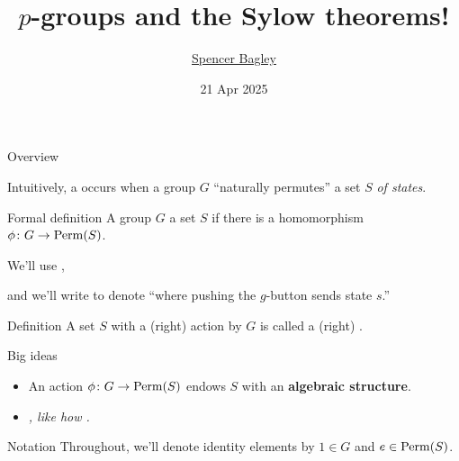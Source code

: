 \documentclass[8pt]{beamer}
\title[$p$-groups and the Sylow theorems!]{$p$-groups and the Sylow theorems!}
\author[\href{mailto:sbagley@westminsteru.edu}{S. Bagley}]
       {\href{mailto:sbagley@westminsteru.edu}{Spencer Bagley}}
\institute[Westminster] { 
  \normalsize With many thanks to Matthew Macauley, \\
  \url{http://www.math.clemson.edu/~macaule/}}
\date[21 Apr 2025]{21 Apr 2025}
\newcommand{\Pause}{\pause}      %
\begin{document}
\frame{\titlepage}


\begin{frame}{Overview} %

  Intuitively, a  occurs when a group $G$
  ``naturally permutes'' a set $S$ \emph{of states}.

  \medskip

  \begin{block}{Formal definition}
    A group $G$  a set $S$ if there is a homomorphism
    $\phi\colon G\to\operatorname{Perm}(S)$. 

    We'll use ,
    
    and we'll write  to denote ``where pushing the $g$-button sends state $s$.''
  \end{block} 

  \begin{block}{Definition}
    A set $S$ with a (right) action by $G$ is called a (right)
    .
  \end{block} 
  
  \begin{alertblock}{Big ideas}
   \begin{itemize}
    \item An action $\phi\colon G\to\operatorname{Perm}(S)$ endows $S$ with an
      \textbf{algebraic structure}. 
    \item \emph{, like how
      .}
    \end{itemize}
  \end{alertblock}

  \begin{exampleblock}{Notation}
    Throughout, we'll denote identity elements by $1\in G$ and $e\in\operatorname{Perm}(S)$.
  \end{exampleblock}
  
\end{frame}

\end{document}
